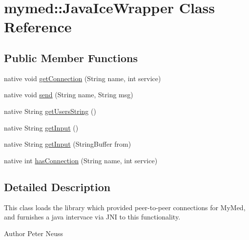 \hypertarget{classmymed_1_1JavaIceWrapper}{
\section{mymed::JavaIceWrapper Class Reference}
\label{classmymed_1_1JavaIceWrapper}
}
\subsection*{Public Member Functions}
\begin{DoxyCompactItemize}
\item 
native void \hyperlink{classmymed_1_1JavaIceWrapper_acbc9014ee604c6dfbec6e1f3c1f4500e}{getConnection} (String name, int service)
\item 
native void \hyperlink{classmymed_1_1JavaIceWrapper_ae3d2b5589121f5d5f0184aea567fd4e5}{send} (String name, String msg)
\item 
native String \hyperlink{classmymed_1_1JavaIceWrapper_af9bc0222407efaa31cb5237dbc3056c2}{getUsersString} ()
\item 
native String \hyperlink{classmymed_1_1JavaIceWrapper_a800d9af066725c394979d86aabb10ba8}{getInput} ()
\item 
native String \hyperlink{classmymed_1_1JavaIceWrapper_a8a950610ddf0c69e287f6d1702b97387}{getInput} (StringBuffer from)
\item 
native int \hyperlink{classmymed_1_1JavaIceWrapper_af06e8244e449b1b5e65948ea70581d6a}{hasConnection} (String name, int service)
\end{DoxyCompactItemize}


\subsection{Detailed Description}
This class loads the library which provided peer-\/to-\/peer connections for MyMed, and furnishes a java intervace via JNI to this functionality. \begin{DoxyAuthor}{Author}
Peter Neuss 
\end{DoxyAuthor}


